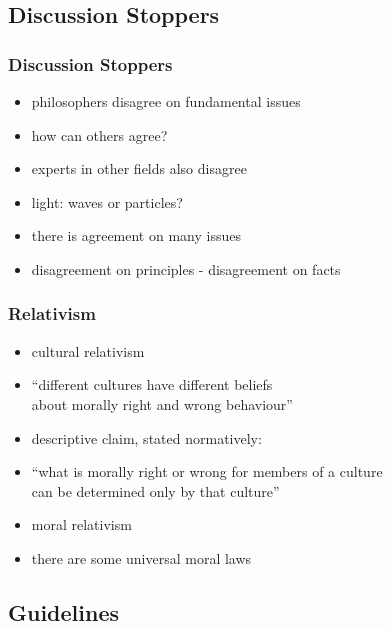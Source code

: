 \documentclass[dvipsnames]{beamer}
\theoremstyle{plain}
\begin{document}
\subsection{Discussion Stoppers}

\begin{frame}
  \frametitle{Discussion Stoppers}

  \begin{itemize}
    \item philosophers disagree on fundamental issues
    \item how can others agree?

    \pause
    \bigskip
    \item experts in other fields also disagree
    \item light: waves or particles?

    \pause
    \medskip
    \item there is agreement on many issues

    \pause
    \medskip
    \item disagreement on principles - disagreement on facts
  \end{itemize}
\end{frame}

\begin{frame}
  \frametitle{Relativism}

  \begin{itemize}
    \item cultural relativism
    \item ``different cultures have different beliefs\\
      about morally right and wrong behaviour''

    \pause
    \medskip
    \item descriptive claim, stated normatively:
    \item ``what is morally right or wrong for members of a culture\\
      can be determined only by that culture''
    \item moral relativism

    \pause
    \medskip
    \item there are some universal moral laws
  \end{itemize}
\end{frame}

\subsection{Guidelines}
\end{document}
